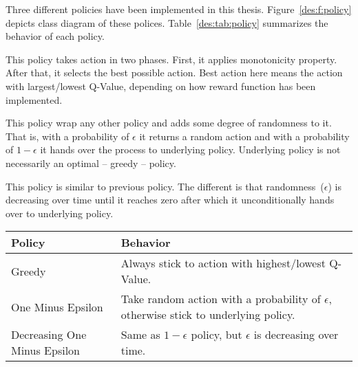Three different policies have been implemented in this thesis. Figure~\ref{des:f:policy} depicts class diagram of these polices. Table~\ref{des:tab:policy} summarizes the behavior of each policy.
\begin{description}[leftmargin=0pt]
    \item[Greedy Policy] This policy takes action in two phases. First, it applies monotonicity property. After that, it selects the best possible action. Best action here means the action with largest/lowest Q-Value, depending on how reward function has been implemented.
    \item[One Minus Epsilon Policy] This policy wrap any other policy and adds some degree of randomness to it. That is, with a probability of $\epsilon$ it returns a random action and with a probability of $1-\epsilon$ it hands over the process to underlying policy. Underlying policy is not necessarily an optimal -- greedy -- policy.
    \item[Decreasing One Minus Epsilon Policy] This policy is similar to previous policy. The different is that randomness~($\epsilon$) is decreasing over time until it reaches zero after which it unconditionally hands over to underlying policy.
\end{description}
\begin{table*}[h]
    \begin{tabular}{ll}
        \toprule
        \textbf{Policy} & \textbf{Behavior}\\
        \midrule
        Greedy & Always stick to action with highest/lowest Q-Value.\\
        One Minus Epsilon & Take random action with a probability of $\epsilon$, otherwise stick to underlying policy. \\
        Decreasing One Minus Epsilon & Same as $1-\epsilon$ policy, but $\epsilon$ is decreasing over time.\\
        \bottomrule
    \end{tabular}
    \centering
    \caption{Summary of Policy Functions}
    \label{des:tab:policy}
\end{table*}
